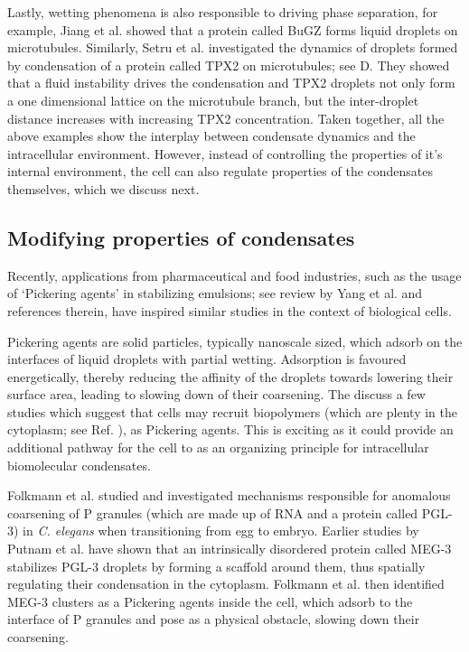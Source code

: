 Lastly, wetting phenomena is also responsible to driving phase separation, for example, Jiang et al. \cite{Jiang2015} showed that a protein called BuGZ forms liquid droplets on microtubules.
Similarly, Setru et al. \cite{Setru2021} investigated the dynamics of droplets formed by condensation of a protein called TPX2 on microtubules; see D. 
They showed that a fluid instability drives the condensation and TPX2 droplets not only form a one dimensional lattice on the microtubule branch, but the inter-droplet distance increases with increasing TPX2 concentration.
Taken together, all the above examples show the interplay between condensate dynamics and the intracellular environment. 
However, instead of controlling the properties of it's internal environment, the cell can also regulate properties of the condensates themselves, which we discuss next. 

\subsection{Modifying properties of condensates}

Recently, applications from pharmaceutical and food industries, such as the usage of `Pickering agents' in stabilizing emulsions; see review by Yang et al. \cite{Yang2017} and references therein, have inspired similar studies in the context of biological cells.

Pickering agents are solid particles, typically nanoscale sized, which adsorb on the interfaces of liquid droplets with partial wetting. Adsorption is favoured energetically, thereby reducing the affinity of the droplets towards lowering their surface area, leading to slowing down of their coarsening.
The discuss a few studies which suggest that cells may recruit biopolymers (which are plenty in the cytoplasm; see Ref. \cite{Burla2019}), as Pickering agents.
This is exciting as it could provide an additional pathway for the cell to as an organizing principle for intracellular biomolecular condensates.

Folkmann et al. \cite{Folkmann2021} studied and investigated mechanisms responsible for anomalous coarsening of P granules (which are made up of RNA and a protein called PGL-3) in \textit{C. elegans} when transitioning from egg to embryo.
Earlier studies by Putnam et al. \cite{Putnam2019} have shown that an intrinsically disordered protein called MEG-3 stabilizes PGL-3 droplets by forming a scaffold around them, thus spatially regulating their condensation in the cytoplasm.
Folkmann et al. then identified MEG-3 clusters as a Pickering agents inside the cell, which adsorb to the interface of P granules and pose as a physical obstacle, slowing down their coarsening.

